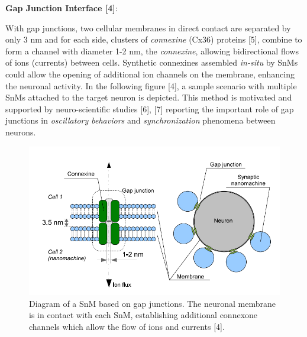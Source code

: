 \documentclass[12pt, letterpaper]{article}
\begin{document}
\textbf{Gap Junction Interface [4]}:

With gap junctions, two cellular membranes in direct contact are separated by only 3 nm and for each side, clusters of \textit{connexine} (Cx36) proteins [5], combine to form a channel with diameter 1-2 nm, the \textit{connexine}, allowing bidirectional flows of ions (currents) between cells. Synthetic connexines assembled \textit{in-situ} by SnMs could allow the opening of additional ion channels on the membrane, enhancing the neuronal activity. In the following figure [4], a sample scenario with multiple SnMs attached to the target neuron is depicted. This method is motivated and supported by neuro-scientific studies [6], [7] reporting the important role of gap junctions in \textit{oscillatory behaviors} and \textit{synchronization} phenomena between neurons.

\begin{figure}[H]
\centering
\includegraphics[width=.78\textwidth,height=.3\textheight]{Gap.png}
\caption{ Diagram of a SnM based on gap junctions. The neuronal membrane is in contact with each SnM, establishing additional connexone channels which allow the flow of ions and currents [4].}
\label{new_1}
\end{figure}


\end{document}
